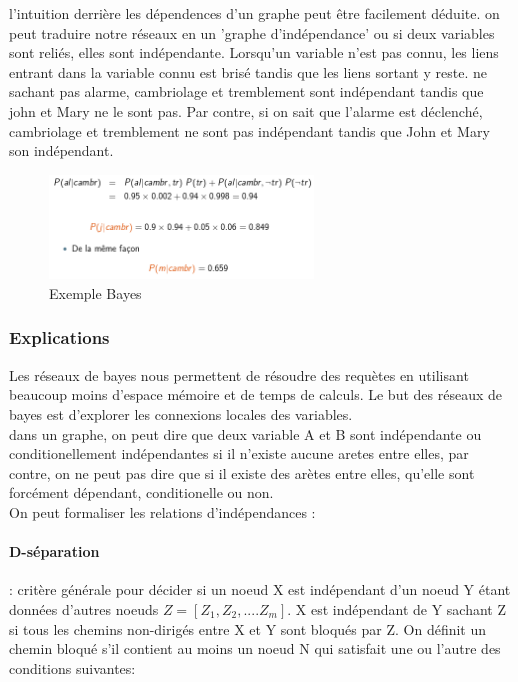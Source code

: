 \documentclass[oneside]{book}
\begin{document}
l'intuition derrière les dépendences d'un graphe peut être facilement déduite. on peut traduire notre réseaux en un 'graphe d'indépendance' ou si deux variables sont reliés, elles sont indépendante. Lorsqu'un variable n'est pas connu, les liens entrant dans la variable connu est brisé tandis que les liens sortant y reste. ne sachant pas alarme, cambriolage et tremblement sont indépendant tandis que john et Mary ne le sont pas. Par contre, si on sait que l'alarme est déclenché, cambriolage et tremblement ne sont pas indépendant tandis que John et Mary son indépendant.\\

\begin{figure}[!ht]
\centering
\includegraphics[width=7cm]{Exemple_Bayes.png}
\caption{Exemple Bayes}
\label{fig:Exemple_Bayes}
\end{figure}

\subsubsection{Explications}
Les réseaux de bayes nous permettent de résoudre des requètes en utilisant beaucoup moins d'espace mémoire et de temps de calculs. Le but des réseaux de bayes est d'explorer les connexions locales des variables.\\

dans un graphe, on peut dire que deux variable A et B sont indépendante ou conditionellement indépendantes si il n'existe aucune aretes entre elles, par contre, on ne peut pas dire que si il existe des arètes entre elles, qu'elle sont forcément dépendant, conditionelle ou non.\\

On peut formaliser les relations d'indépendances :\\

\paragraph{D-séparation}: critère générale pour décider si un noeud X est indépendant d'un noeud Y étant données d'autres noeuds $Z=[Z_1,Z_2,....Z_m]$. X est indépendant de Y sachant Z si tous les chemins non-dirigés entre X et Y sont bloqués par Z. On définit un chemin bloqué s'il contient au moins un noeud N qui satisfait une ou l'autre des conditions suivantes:
\end{document}

